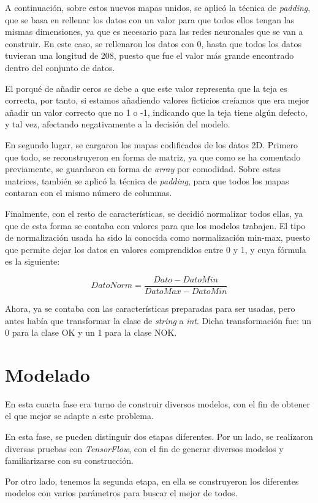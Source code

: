 A continuación, sobre estos nuevos mapas unidos, se aplicó la técnica de \emph{padding}, que se basa en rellenar los datos con un valor para que todos ellos tengan las mismas dimensiones, ya que es necesario para las redes neuronales que se van a construir. En este caso, se rellenaron los datos con 0, hasta que todos los datos tuvieran una longitud de 208, puesto que fue el valor más grande encontrado dentro del conjunto de datos.

El porqué de añadir ceros se debe a que este valor representa que la teja es correcta, por tanto, si estamos añadiendo valores ficticios creíamos que era mejor añadir un valor correcto que no 1 o -1, indicando que la teja tiene algún defecto, y tal vez, afectando negativamente a la decisión del modelo.

En segundo lugar, se cargaron los mapas codificados de los datos 2D. Primero que todo, se reconstruyeron en forma de matriz, ya que como se ha comentado previamente, se guardaron en forma de \emph{array} por comodidad. Sobre estas matrices, también se aplicó la técnica de \emph{padding}, para que todos los mapas contaran con el mismo número de columnas.

Finalmente, con el resto de características, se decidió normalizar todos ellas, ya que de esta forma se contaba con valores para que los modelos trabajen. El tipo de normalización usada ha sido la conocida como normalización min-max, puesto que permite dejar los datos en valores comprendidos entre 0 y 1, y cuya fórmula es la siguiente:

$$DatoNorm = \frac{Dato - DatoMin}{{DatoMax} - {DatoMin}}$$

Ahora, ya se contaba con las características preparadas para ser usadas, pero antes había que transformar la clase de \emph{string} a \emph{int}. Dicha transformación fue: un 0 para la clase OK y un 1 para la clase NOK.

\section{Modelado}
En esta cuarta fase era turno de construir diversos modelos, con el fin de obtener el que mejor se adapte a este problema. 

En esta fase, se pueden distinguir dos etapas diferentes. Por un lado, se realizaron diversas pruebas con \emph{TensorFlow}, con el fin de generar diversos modelos y familiarizarse con su construcción. 

Por otro lado, tenemos la segunda etapa, en ella se construyeron los diferentes modelos con varios parámetros para buscar el mejor de todos.

